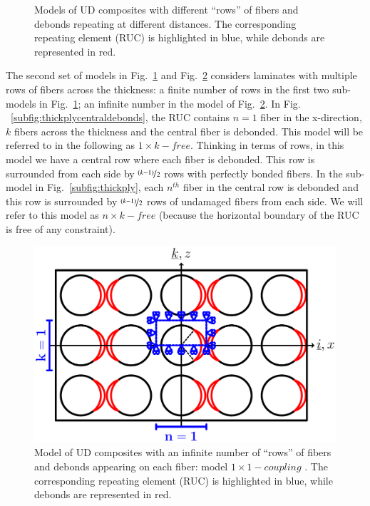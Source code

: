 \documentclass[review]{elsarticle}
\begin{document}
\begin{figure}[!h]
\caption{Models of UD composites with different ``rows'' of fibers and debonds repeating at different distances. The corresponding repeating element (RUC) is highlighted in blue, while debonds are represented in red.}\label{fig:laminateModelsB}
\end{figure}

The second set of models in Fig.~\ref{fig:laminateModelsB} and Fig.~\ref{fig:thickplyalldebonds} considers laminates with multiple rows of fibers across the thickness: a finite number of rows in the first two sub-models in Fig.~\ref{fig:laminateModelsB}; an infinite number in the model of Fig.~\ref{fig:thickplyalldebonds}. In Fig. ~\ref{subfig:thickplycentraldebonds}, the RUC contains $n=1$ fiber in the x-direction, $k$ fibers across the thickness and the central fiber is debonded. This model will be referred to in the following as $1\times k-free$. Thinking in terms of rows, in this model we have a central row where each fiber is debonded. This row is surrounded from each side by $\nicefrac{\left(k-1\right)}{2}$ rows with perfectly bonded fibers. In the sub-model in Fig.~\ref{subfig:thickply}, each $n^{th}$ fiber in the central row is debonded and this row is surrounded by $\nicefrac{\left(k-1\right)}{2}$ rows of undamaged fibers from each side. We will refer to this model as $n\times k-free$ (because the horizontal boundary of the RUC is free of any constraint).

\begin{figure}[!h]
\centering
\includegraphics[width=\textwidth]{thickPlyAllDebonds.pdf}
\caption{Model of UD composites with an infinite number of  ``rows'' of fibers and debonds appearing on each fiber: model $1\times1-coupling$ . The corresponding repeating element (RUC) is highlighted in blue, while debonds are represented in red.}\label{fig:thickplyalldebonds}
\end{figure}
\end{document}
